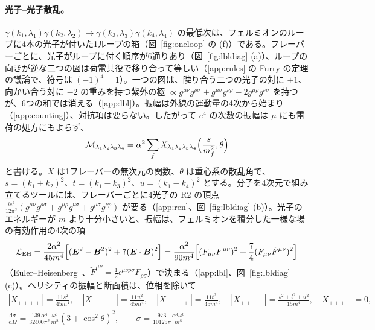 \documentclass[a4paper,10pt]{ltjsarticle}
\newcommand{\dd}{\mathrm{d}}
\begin{document}
\paragraph{光子--光子散乱。}$\gamma(k_1,\lambda_1)\gamma(k_2,\lambda_2)\to\gamma(k_3,\lambda_3)\gamma(k_4,\lambda_4)$ の最低次は、フェルミオンのループに4本の光子が付いた1ループの箱（図~\ref{fig:oneloop} の (f)）である。フレーバーごとに、光子がループに付く順序が6通りあり（図~\ref{fig:lbldiag} (a)）、ループの向きが逆な二つの図は荷電共役で移り合って等しい（\ref{app:rules} の Furry の定理の議論で、符号は $(-1)^4=1$）。一つの図は、隣り合う二つの光子の対に $+1$、向かい合う対に $-2$ の重みを持つ紫外の極 $\propto g^{\mu\nu}g^{\rho\sigma}+g^{\mu\sigma}g^{\nu\rho}-2g^{\mu\rho}g^{\nu\sigma}$ を持つが、6つの和では消える（\ref{app:lbl}）。振幅は外線の運動量の4次から始まり（\ref{app:counting}）、対抗項は要らない。したがって $e^4$ の次数の振幅は $\mu$ にも電荷の処方にもよらず、
\begin{equation}
\mathcal M_{\lambda_1\lambda_2\lambda_3\lambda_4}=\alpha^2\sum_fX_{\lambda_1\lambda_2\lambda_3\lambda_4}\Bigl(\frac{s}{m_f^2},\theta\Bigr)
\label{eq:lblamp}
\end{equation}
と書ける。$X$ は1フレーバーの無次元の関数、$\theta$ は重心系の散乱角で、$s=(k_1+k_2)^2$、$t=(k_1-k_3)^2$、$u=(k_1-k_4)^2$ とする。分子を4次元で組み立てるツールには、フレーバーごとに4光子の R2 の頂点 $\frac{ie^4}{12\pi^2}(g^{\mu\nu}g^{\rho\sigma}+g^{\mu\rho}g^{\nu\sigma}+g^{\mu\sigma}g^{\nu\rho})$ が要る（\ref{app:ren}、図~\ref{fig:lbldiag} (b)）。光子のエネルギーが $m$ より十分小さいと、振幅は、フェルミオンを積分した一様な場の有効作用の4次の項
\begin{equation}
\mathcal L_{\mathrm{EH}}=\frac{2\alpha^2}{45m^4}\Bigl[(\boldsymbol E^2-\boldsymbol B^2)^2+7(\boldsymbol E\cdot\boldsymbol B)^2\Bigr]
=\frac{\alpha^2}{90m^4}\Bigl[(F_{\mu\nu}F^{\mu\nu})^2+\frac74(F_{\mu\nu}\tilde F^{\mu\nu})^2\Bigr]
\label{eq:eh}
\end{equation}
（Euler--Heisenberg~\cite{eh}、$\tilde F^{\mu\nu}=\frac12\epsilon^{\mu\nu\rho\sigma}F_{\rho\sigma}$）で決まる（\ref{app:lbl}、図~\ref{fig:lbldiag} (c)）。ヘリシティの振幅と断面積は、位相を除いて
\begin{equation}
\begin{gathered}
|X_{++++}|=\frac{11s^2}{45m^4},\quad|X_{+-+-}|=\frac{11u^2}{45m^4},\quad|X_{+--+}|=\frac{11t^2}{45m^4},\quad|X_{++--}|=\frac{s^2+t^2+u^2}{15m^4},\quad X_{+++-}=0,\\
\frac{\dd\sigma}{\dd\Omega}=\frac{139\,\alpha^4}{32400\pi^2}\frac{\omega^6}{m^8}(3+\cos^2\theta)^2,\qquad\sigma=\frac{973}{10125\pi}\frac{\alpha^4\omega^6}{m^8}
\end{gathered}
\label{eq:lbllow}
\end{equation}
\end{document}

